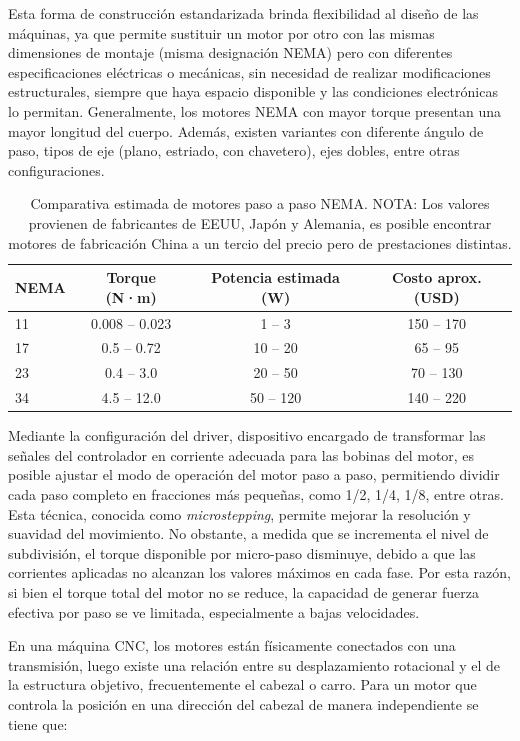 Esta forma de construcción estandarizada brinda flexibilidad al diseño de las máquinas, ya que permite sustituir un motor por otro con las mismas dimensiones de montaje (misma designación NEMA) pero con diferentes especificaciones eléctricas o mecánicas, sin necesidad de realizar modificaciones estructurales, siempre que haya espacio disponible y las condiciones electrónicas lo permitan. Generalmente, los motores NEMA con mayor torque presentan una mayor longitud del cuerpo. Además, existen variantes con diferente ángulo de paso, tipos de eje (plano, estriado, con chavetero), ejes dobles, entre otras configuraciones.

\begin{table}[h]
\centering
\caption{Comparativa estimada de motores paso a paso NEMA. NOTA: Los valores provienen de fabricantes de EEUU, Japón y Alemania, es posible encontrar motores de fabricación China a un tercio del precio pero de prestaciones distintas.}
\label{tab:stepper_nema_comparison}
\begin{tabular}{lccc}
\toprule
\textbf{NEMA} & \textbf{Torque (N·m)} & \textbf{Potencia estimada (W)} & \textbf{Costo aprox. (USD)} \\
\midrule
11 & 0.008 – 0.023 & 1 – 3 & 150 – 170 \\
17 & 0.5 – 0.72 & 10 – 20 & 65 – 95 \\
23 & 0.4 – 3.0 & 20 – 50 & 70 – 130 \\
34 & 4.5 – 12.0 & 50 – 120 & 140 – 220 \\
\bottomrule
\end{tabular}
\end{table}

Mediante la configuración del driver, dispositivo encargado de transformar las señales del controlador en corriente adecuada para las bobinas del motor, es posible ajustar el modo de operación del motor paso a paso, permitiendo dividir cada paso completo en fracciones más pequeñas, como 1/2, 1/4, 1/8, entre otras. Esta técnica, conocida como \textit{microstepping}, permite mejorar la resolución y suavidad del movimiento. No obstante, a medida que se incrementa el nivel de subdivisión, el torque disponible por micro-paso disminuye, debido a que las corrientes aplicadas no alcanzan los valores máximos en cada fase. Por esta razón, si bien el torque total del motor no se reduce, la capacidad de generar fuerza efectiva por paso se ve limitada, especialmente a bajas velocidades.

En una máquina CNC, los motores están físicamente conectados con una transmisión, luego existe una relación entre su desplazamiento rotacional y el de la estructura objetivo, frecuentemente el cabezal o carro. Para un motor que controla la posición en una dirección del cabezal de manera independiente se tiene que:

